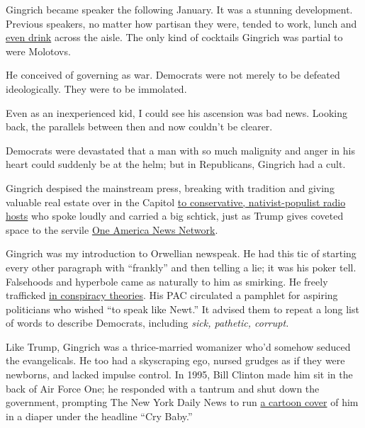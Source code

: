 Gingrich became speaker the following January. It was a stunning
development. Previous speakers, no matter how partisan they were, tended
to work, lunch and
\href{https://campaignstops.blogs.nytimes.com/2012/10/05/frenemies-a-love-story/}{even
drink} across the aisle. The only kind of cocktails Gingrich was partial
to were Molotovs.

He conceived of governing as war. Democrats were not merely to be
defeated ideologically. They were to be immolated.

Even as an inexperienced kid, I could see his ascension was bad news.
Looking back, the parallels between then and now couldn't be clearer.

Democrats were devastated that a man with so much malignity and anger in
his heart could suddenly be at the helm; but in Republicans, Gingrich
had a cult.

Gingrich despised the mainstream press, breaking with tradition and
giving valuable real estate over in the Capitol
\href{https://www.washingtonpost.com/archive/lifestyle/1995/01/05/the-talkmeisters/528fe9d1-e4e7-4c51-a0a1-d5f6e2fee610/}{to
conservative, nativist-populist radio hosts} who spoke loudly and
carried a big schtick, just as Trump gives coveted space to the servile
\href{https://www.nytimes.com/article/oann-trump.html}{One America News
Network}.

Gingrich was my introduction to Orwellian newspeak. He had this tic of
starting every other paragraph with ``frankly'' and then telling a lie;
it was his poker tell. Falsehoods and hyperbole came as naturally to him
as smirking. He freely trafficked
\href{https://www.washingtonpost.com/archive/politics/1995/07/26/gingrich-not-convinced-foster-death-was-suicide/4003f01f-83ad-4b41-9b9c-e209344a716c/}{in
conspiracy theories}. His PAC circulated a pamphlet for aspiring
politicians who wished ``to speak like Newt.'' It advised them to repeat
a long list of words to describe Democrats, including \emph{sick,
pathetic, corrupt.}

Like Trump, Gingrich was a thrice-married womanizer who'd somehow
seduced the evangelicals. He too had a skyscraping ego, nursed grudges
as if they were newborns, and lacked impulse control. In 1995, Bill
Clinton made him sit in the back of Air Force One; he responded with a
tantrum and shut down the government, prompting The New York Daily News
to run
\href{https://www.nydailynews.com/blogs/pageviews/newt-gingrich-crybaby-famous-daily-news-cover-explained-blog-entry-1.1637386}{a
cartoon cover} of him in a diaper under the headline ``Cry Baby.''

